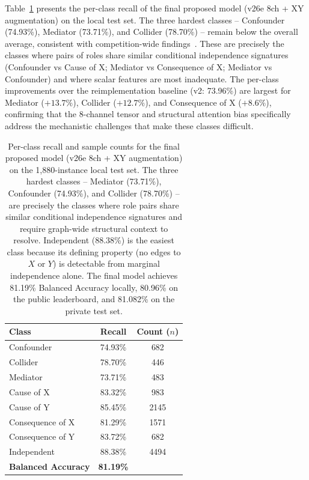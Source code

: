 Table~\ref{tab:perclass_final} presents the per-class recall of the final proposed model (v26e 8ch + XY augmentation) on the local test set. The three hardest classes -- Confounder (74.93\%), Mediator (73.71\%), and Collider (78.70\%) -- remain below the overall average, consistent with competition-wide findings~\cite{olivetti2025adialab}. These are precisely the classes where pairs of roles share similar conditional independence signatures (Confounder vs Cause of X; Mediator vs Consequence of X; Mediator vs Confounder) and where scalar features are most inadequate. The per-class improvements over the reimplementation baseline (v2: 73.96\%) are largest for Mediator ($+13.7\%$), Collider ($+12.7\%$), and Consequence of X ($+8.6\%$), confirming that the 8-channel tensor and structural attention bias specifically address the mechanistic challenges that make these classes difficult.

\begin{table}[ht]
	\centering
	\caption{Per-class recall and sample counts for the final proposed model (v26e 8ch + XY augmentation) on the 1,880-instance local test set. The three hardest classes -- Mediator (73.71\%), Confounder (74.93\%), and Collider (78.70\%) -- are precisely the classes where role pairs share similar conditional independence signatures and require graph-wide structural context to resolve. Independent (88.38\%) is the easiest class because its defining property (no edges to $X$ or $Y$) is detectable from marginal independence alone. The final model achieves 81.19\% Balanced Accuracy locally, 80.96\% on the public leaderboard, and 81.082\% on the private test set.}
	\label{tab:perclass_final}
	\begin{tabular}{lcc}
		\toprule
		\textbf{Class}              & \textbf{Recall}  & \textbf{Count ($n$)} \\
		\midrule
		Confounder                   & 74.93\%          & 682                  \\
		Collider                     & 78.70\%          & 446                  \\
		Mediator                     & 73.71\%          & 483                  \\
		Cause of X                   & 83.32\%          & 983                  \\
		Cause of Y                   & 85.45\%          & 2145                 \\
		Consequence of X             & 81.29\%          & 1571                 \\
		Consequence of Y             & 83.72\%          & 682                  \\
		Independent                  & 88.38\%          & 4494                 \\
		\midrule
		\textbf{Balanced Accuracy}  & \textbf{81.19\%} &                      \\
		\bottomrule
	\end{tabular}
\end{table}

